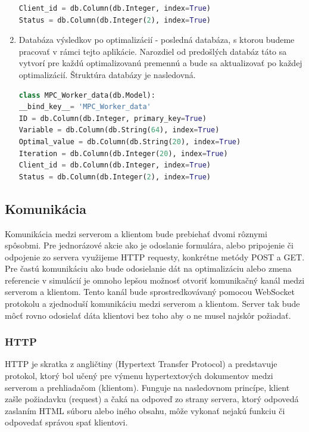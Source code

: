 \begin{enumerate}
{\begin{lstlisting}[language=Python]
Client_id = db.Column(db.Integer, index=True)
Status = db.Column(db.Integer(2), index=True)
\end{lstlisting}
}
\label{DB:WORKER_DATA}
\item{ Databáza výsledkov po optimalizácií - posledná databáza, s ktorou budeme pracovať v rámci tejto aplikácie. Narozdiel od predošlých databáz táto sa vytvorí pre každú optimalizovanú premennú a bude sa aktualizovať po každej optimalizácií. Štruktúra databázy je nasledovná.
\begin{lstlisting}[language=Python]
class MPC_Worker_data(db.Model):
__bind_key__= 'MPC_Worker_data'
ID = db.Column(db.Integer, primary_key=True)
Variable = db.Column(db.String(64), index=True)
Optimal_value = db.Column(db.String(20), index=True)
Iteration = db.Column(db.Integer(20), index=True)
Client_id = db.Column(db.Integer, index=True)
Status = db.Column(db.Integer(2), index=True)
\end{lstlisting}
}
\end{enumerate}

\subsection{Komunikácia}
Komunikácia medzi serverom a klientom bude prebiehať dvomi rôznymi spôsobmi. Pre jednorázové akcie ako je odoslanie formulára, alebo pripojenie či odpojenie zo servera využijeme HTTP requesty, konkrétne metódy POST a GET. Pre častú komunikáciu ako bude odosielanie dát na optimalizáciu alebo zmena referencie v simulácií je omnoho lepšou možnosť otvoriť komunikačný kanál medzi serverom a klientom. Tento kanál bude sprostredkovávaný pomocou WebSocket protokolu a zjednoduší komunikáciu medzi serverom a klientom. Server tak bude môcť rovno odosielať dáta klientovi bez toho aby o ne musel najskôr požiadať. 

\subsubsection{HTTP}
HTTP je skratka z angličtiny (Hypertext Transfer Protocol) a predstavuje protokol, ktorý bol učený pre výmenu hypertextových dokumentov medzi serverom a prehliadačom (klientom). Funguje na nasledovnom princípe, klient zašle požiadavku (request) a čaká na odpoveď zo strany servera, ktorý odpovedá zaslaním HTML súboru alebo iného obsahu, môže vykonať nejakú funkciu či odpovedať správou spať klientovi. 


